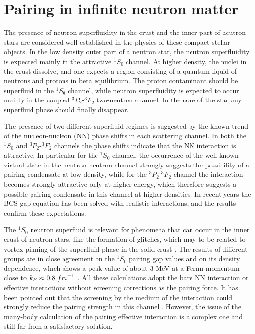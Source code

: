 \documentclass{elsart}
\begin{document}
\section{Pairing in infinite neutron matter}\label{sec:sec2}
The presence of neutron superfluidity in 
the crust and the inner part 
of neutron stars 
are considered well established 
in the physics of these compact stellar objects. 
In the low density outer part of a neutron star, 
the neutron superfluidity is expected 
mainly in the attractive $^1S_0$ channel. 
At higher density, the nuclei in the crust dissolve, and one 
expects a region consisting of a quantum liquid of neutrons and 
protons in beta equilibrium. 
The proton contaminant should be superfluid 
in the $^1S_0$ channel, while neutron superfluidity is expected to  
occur mainly in the coupled $^3P_2$-$^3F_2$ two-neutron channel. 
In the core of the star any superfluid 
phase should finally disappear.
 
The presence of two different superfluid regimes 
is suggested by the known trend of the 
nucleon-nucleon (NN) phase shifts 
in each scattering channel. 
In both the $^1S_0$ and $^3P_2$-$^3F_2$ channels the
phase shifts indicate that the NN interaction is attractive. 
In particular for the $^1S_0$ channel, the occurrence of 
the well known virtual state in the neutron-neutron channel
strongly suggests the possibility of a 
pairing condensate at low density, 
while for the $^3P_2$-$^3F_2$ channel the 
interaction becomes strongly attractive only
at higher energy, which therefore suggests a possible 
pairing condensate
in this channel at higher densities. 
In recent years the BCS gap equation
has been solved with realistic interactions, 
and the results confirm
these expectations. 

The $^1S_0$ neutron superfluid is relevant for phenomena
that can occur in the inner crust of neutron stars, like the 
formation of glitches, which may to be related to vortex pinning  
of the superfluid phase in the solid crust \cite{glitch}. 
The results of different groups are in close agreement
on the $^1S_0$ pairing gap values and on 
its density dependence, which
shows a peak value of about 3 MeV at a Fermi momentum close to
$k_F \approx 0.8\; {\rm fm}^{-1}$ \cite{bcll90,kkc96,eh98,sclbl96}. 
All these calculations adopt the bare
NN interaction or effective interactions without screening 
corrections as the pairing force. It has been pointed out
that the screening by the medium of the interaction 
could strongly reduce
the pairing strength in this channel \cite{sclbl96,chen86,ains89}. 
However, the issue of the 
many-body calculation of the pairing 
effective interaction is a complex
one and still far from a satisfactory solution.
\end{document}
